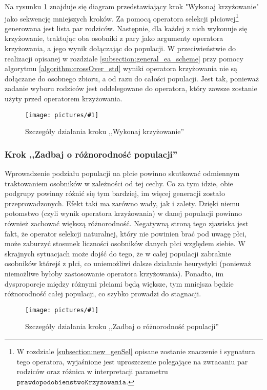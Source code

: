 \documentclass[twoside]{iisthesis}
\newcommand{\param}[1]{\mathtt{#1}}
\newcommand{\img}[1]{\texttt{[image: pictures/\#1]}}
\begin{document}
Na rysunku \ref{figure:my_crossover} znajduje się diagram przedstawiający krok "Wykonaj krzyżowanie" jako sekwencję mniejszych kroków. Za pomocą operatora selekcji płciowej\footnote{W rozdziale \ref{subsection:new_genSel} opisane zostanie znaczenie i sygnatura tego operatora, wyjaśnione jest uproszczenie polegające na zwracaniu par rodziców oraz różnica w interpretacji parametru $\param{prawdopodobienstwoKrzyzowania}$. } generowana jest lista par rodziców. Następnie, dla każdej z nich wykonuje się krzyżowanie, traktując oba osobniki z pary jako argumenty operatora krzyżowania, a jego wynik dołączając do populacji. W przeciwieństwie do realizacji opisanej w rozdziale \ref{subsection:general_ea_scheme} przy pomocy algorytmu \ref{algorithm:crossOver_std} wyniki operatora krzyżowania nie są dołączane do osobnego zbioru, a od razu do całości populacji. Jest tak, ponieważ zadanie wyboru rodziców jest oddelegowane do operatora, który zawsze zostanie użyty przed operatorem krzyżowania.

\begin{figure}[H]
	\caption{Szczegóły działania kroku ,,Wykonaj krzyżowanie'' \label{figure:my_crossover}}
	\img{my_crossover.png}
\end{figure}

\subsubsection{Krok ,,Zadbaj o różnorodność populacji''} \label{subsubsection:fixing}

Wprowadzenie podziału populacji na płcie powinno skutkować odmiennym traktowaniem osobników w zależności od tej cechy. Co za tym idzie, obie podgrupy powinny różnić się tym bardziej, im więcej generacji zostało przeprowadzonych. Efekt taki ma zarówno wady, jak i zalety. Dzięki niemu potomstwo (czyli wynik operatora krzyżowania) w danej populacji powinno również zachować większą różnorodność. Negatywną stroną tego zjawiska jest fakt, że operator selekcji naturalnej, który nie powinien brać pod uwagę płci, może zaburzyć stosunek liczności osobników danych płci względem siebie. W skrajnych sytuacjach może dojść do tego, że w całej populacji zabraknie osobników którejś z płci, co uniemożliwi dalsze działanie heurystyki (ponieważ niemożliwe byłoby zastosowanie operatora krzyżowania). Ponadto, im dysproporcje między różnymi płciami będą większe, tym mniejsza będzie różnorodność całej populacji, co szybko prowadzi do stagnacji.

\begin{figure}[H]
	\caption{Szczegóły działania kroku ,,Zadbaj o różnorodność populacji'' \label{figure:fixing}}
	\img{fixing.png}
\end{figure}
\end{document}
